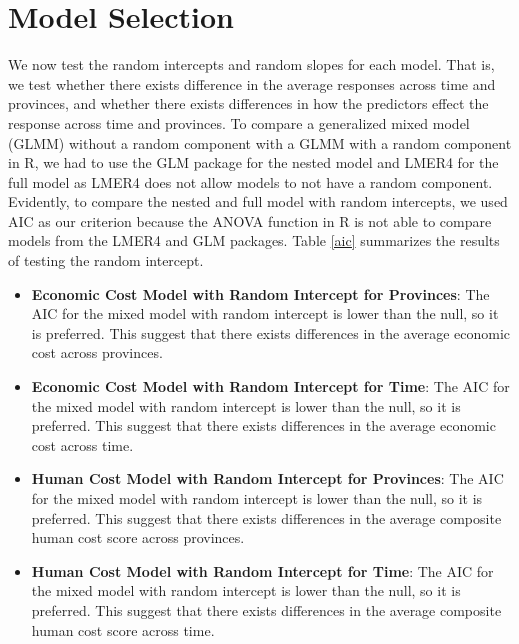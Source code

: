 \section{Model Selection}
We now test the random intercepts and random slopes for each model. That is, we test whether there exists difference in the average responses across time and provinces, and whether there exists differences in how the predictors effect the response across time and provinces.
To compare a generalized mixed model (GLMM) without a random component with a GLMM with a random component in R, we had to use the GLM package for the nested model and LMER4 for the full model as LMER4 does not allow models to not have a random component. Evidently, to compare the nested and full model with random intercepts, we used AIC as our criterion because the ANOVA function in R is not able to compare models from the LMER4 and GLM packages. Table \ref{aic} summarizes the results of testing the random intercept.

\begin{itemize}
	\item \textbf{Economic Cost Model with Random Intercept for Provinces}: The AIC for the mixed model with random intercept is lower than the null, so it is preferred. This suggest that there exists differences in the average economic cost across provinces.
	\item \textbf{Economic Cost Model with Random Intercept for Time}: The AIC for the mixed model with random intercept is lower than the null, so it is preferred. This suggest that there exists differences in the average economic cost across time.
	\item \textbf{Human Cost Model with Random Intercept for Provinces}: The AIC for the mixed model with random intercept is lower than the null, so it is preferred. This suggest that there exists differences in the average composite human cost score across provinces.
	\item \textbf{Human Cost Model with Random Intercept for Time}: The AIC for the mixed model with random intercept is lower than the null, so it is preferred. This suggest that there exists differences in the average composite human cost score across time.
\end{itemize}



